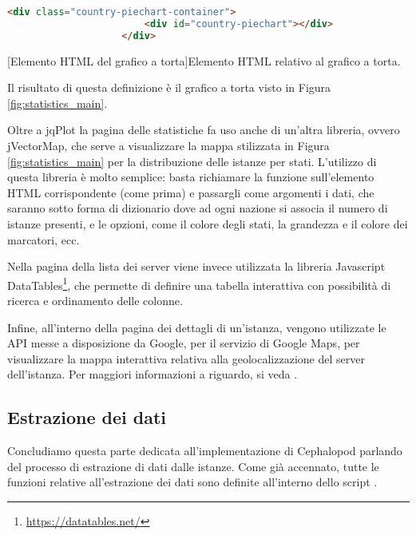             \begin{center}
                \begin{lstlisting}[language=html, gobble=18]
                    <div class="country-piechart-container">
                        <div id="country-piechart"></div>
                    </div>
                \end{lstlisting}
                \captionsetup{textformat=empty,labelformat=empty} \vspace{-2em}
                [Elemento HTML del grafico a torta]{Elemento HTML relativo al grafico a torta.}
            \end{center}
            
            Il risultato di questa definizione è il grafico a torta visto in Figura \ref{fig:statistics_main}.
            
            Oltre a jqPlot la pagina delle statistiche fa uso anche di un'altra libreria, ovvero jVectorMap, che serve a visualizzare la mappa stilizzata in Figura \ref{fig:statistics_main} per la distribuzione delle istanze per stati. L'utilizzo di questa libreria è molto semplice: basta richiamare la funzione  sull'elemento \ac{HTML} corrispondente (come prima) e passargli come argomenti i dati, che saranno sotto forma di dizionario dove ad ogni nazione si associa il numero di istanze presenti, e le opzioni, come il colore degli stati, la grandezza e il colore dei marcatori, ecc.
            
            Nella pagina della lista dei server viene invece utilizzata la libreria Javascript DataTables\footnote{\url{https://datatables.net/}}, che permette di definire una tabella interattiva con possibilità di ricerca e ordinamento delle colonne.
            
            Infine, all'interno della pagina dei dettagli di un'istanza, vengono utilizzate le \ac{API} messe a disposizione da Google, per il servizio di Google Maps, per visualizzare la mappa interattiva relativa alla geolocalizzazione del server dell'istanza. Per maggiori informazioni a riguardo, si veda \cite{google:maps}.
        
        \subsection{Estrazione dei dati} \label{subsec:it;di;estrazione_dati}
        
            Concludiamo questa parte dedicata all'implementazione di Cephalopod parlando del processo di estrazione di dati dalle istanze. Come già accennato, tutte le funzioni relative all'estrazione dei dati sono definite all'interno dello script .
            
